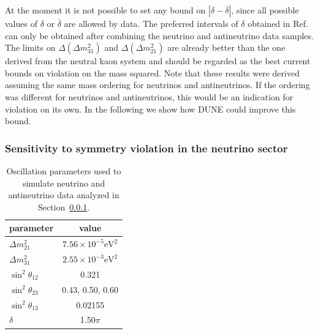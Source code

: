 At the moment it is not possible to set any bound on $|\delta-\overline{\delta}|$, since all possible values of
$\delta$ or $\overline{\delta}$ are allowed by data. The preferred intervals of $\delta$ obtained in Ref.~\cite{deSalas:2017kay} can only be obtained after combining the neutrino and antineutrino data samples. 
The limits  on $\Delta(\Delta m_{31}^2)$ and $\Delta(\Delta m_{21}^2)$  are already better than the one derived from the neutral kaon system and should be regarded as the best current bounds on  violation on the mass squared. %
Note that these results were derived assuming the same mass ordering for neutrinos and antineutrinos. If the ordering was different for neutrinos and antineutrinos, this would be an indication for  violation on its own. In the following we show how DUNE could improve this bound.

\subsubsection{Sensitivity to  symmetry violation in the neutrino sector}
\label{sec:sensitivity}

\begin{table}[htb]\centering
\caption[Oscillation parameters used to simulate (anti)neutrino data]{Oscillation parameters used to simulate neutrino and antineutrino data analyzed in Section~\ref{sec:sensitivity}.}
     \label{tab:par2}
   \begin{tabular}{lc}
    \hline
    parameter & value 
    \\
    \hline
    $\Delta m^2_{21}$& $7.56\times 10^{-5}\text{eV}^2$\\  
    $\Delta m^2_{31}$&  $2.55\times 10^{-3}\text{eV}^2$\\
    $\sin^2\theta_{12}$ & 0.321\\ 
     $\sin^2\theta_{23}$ &  0.43, 0.50, 0.60\\
    $\sin^2\theta_{13}$ & 0.02155\\
   $\delta$ & 1.50$\pi$\\
       \hline
 
     \end{tabular}
\end{table}

